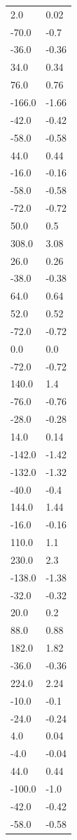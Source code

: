 \begin{longtable}{ll}
2.0 & 0.02 \\
-70.0 & -0.7 \\
-36.0 & -0.36 \\
34.0 & 0.34 \\
76.0 & 0.76 \\
-166.0 & -1.66 \\
-42.0 & -0.42 \\
-58.0 & -0.58 \\
44.0 & 0.44 \\
-16.0 & -0.16 \\
-58.0 & -0.58 \\
-72.0 & -0.72 \\
50.0 & 0.5 \\
308.0 & 3.08 \\
26.0 & 0.26 \\
-38.0 & -0.38 \\
64.0 & 0.64 \\
52.0 & 0.52 \\
-72.0 & -0.72 \\
0.0 & 0.0 \\
-72.0 & -0.72 \\
140.0 & 1.4 \\
-76.0 & -0.76 \\
-28.0 & -0.28 \\
14.0 & 0.14 \\
-142.0 & -1.42 \\
-132.0 & -1.32 \\
-40.0 & -0.4 \\
144.0 & 1.44 \\
-16.0 & -0.16 \\
110.0 & 1.1 \\
230.0 & 2.3 \\
-138.0 & -1.38 \\
-32.0 & -0.32 \\
20.0 & 0.2 \\
88.0 & 0.88 \\
182.0 & 1.82 \\
-36.0 & -0.36 \\
224.0 & 2.24 \\
-10.0 & -0.1 \\
-24.0 & -0.24 \\
4.0 & 0.04 \\
-4.0 & -0.04 \\
44.0 & 0.44 \\
-100.0 & -1.0 \\
-42.0 & -0.42 \\
-58.0 & -0.58 \\

\end{longtable}
